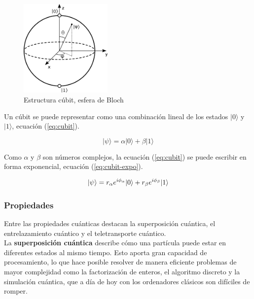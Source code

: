 \begin{figure}[h]
	\centering
	\includegraphics[width=0.4\textwidth]{figuras/esfera_bloch.png}
	\caption{Estructura cúbit, esfera de Bloch \cite{esfera-bloch}}
	\label{fig:esfera-bloch}
\end{figure}

Un cúbit se puede representar como una combinación lineal de los estados $|0\rangle$ y $|1\rangle$, ecuación (\ref{eq:cubit}).

\begin{equation}\label{eq:cubit}
|\psi \rangle = \alpha|0\rangle + \beta |1\rangle
\end{equation}

Como $\alpha$ y $\beta$ son números complejos, la ecuación (\ref{eq:cubit}) se puede escribir en forma exponencial, ecuación (\ref{eq:cubit-expo}).

\begin{equation}\label{eq:cubit-expo}
|\psi\rangle = r_{\alpha} e^{i\phi_{\alpha}}|0\rangle + r_{\beta} e^{i\phi_{\beta}}|1\rangle\\
\end{equation}

\vspace{1em}
\subsubsection{Propiedades}
Entre las propiedades cuánticas destacan la superposición cuántica, el entrelazamiento cuántico y el teletransporte cuántico.\\

La \textbf{superposición cuántica} describe cómo una partícula puede estar en diferentes estados al mismo tiempo. Esto aporta gran capacidad de procesamiento, lo que hace posible resolver de manera eficiente problemas de mayor complejidad como la factorización de enteros, el algoritmo discreto y la simulación cuántica, que a día de hoy con los ordenadores clásicos son difíciles de romper. 

